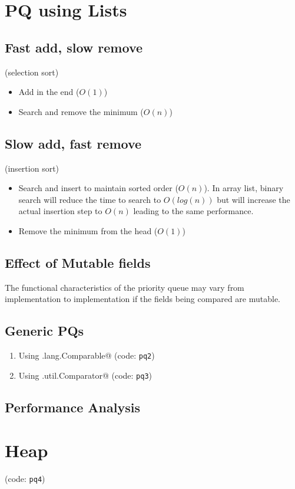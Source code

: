 \documentclass[12pt,a4paper]{article}
\begin{document}
\section{PQ using Lists}
\subsection{Fast add, slow remove}
(selection sort)
\begin{itemize}
\item Add in the end ($O(1)$)
\item Search and remove the minimum ($O(n)$)
\end{itemize}
\subsection{Slow add, fast remove}
(insertion sort)
\begin{itemize}
\item Search and insert to maintain sorted order ($O(n)$). In array list, binary search will reduce the time to search to $O(log(n))$ but will increase the actual insertion step to $O(n)$ leading to the same performance. 
\item Remove the minimum from the head ($O(1)$)
\end{itemize}

\subsection{Effect of Mutable fields}
The functional characteristics of the priority queue may vary from implementation to implementation if the fields being compared are mutable.

\subsection{Generic PQs}
\begin{enumerate}
	\item Using \lstinline@java.lang.Comparable@ (code: \texttt{pq2})
	\item Using \lstinline@java.util.Comparator@ (code: \texttt{pq3})
\end{enumerate}
\subsection{Performance Analysis}

\section{Heap}
(code: \texttt{pq4})
\end{document}
